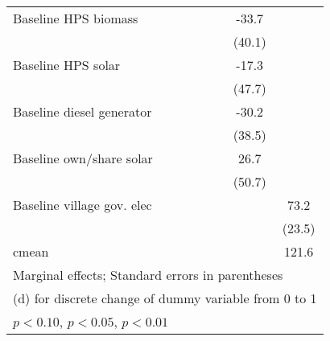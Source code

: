 \begin{table}[htbp]
\begin{tabular*}{1\hsize}{@{\hskip\tabcolsep\extracolsep\fill}l*{6}{c}}
Baseline HPS biomass&                  &                  &                  &                  &    -33.7         &                  \\
                &                  &                  &                  &                  &   (40.1)         &                  \\
Baseline HPS solar&                  &                  &                  &                  &    -17.3         &                  \\
                &                  &                  &                  &                  &   (47.7)         &                  \\
Baseline diesel generator&                  &                  &                  &                  &    -30.2         &                  \\
                &                  &                  &                  &                  &   (38.5)         &                  \\
Baseline own/share solar&                  &                  &                  &                  &     26.7         &                  \\
                &                  &                  &                  &                  &   (50.7)         &                  \\
Baseline village gov. elec&                  &                  &                  &                  &                  &     73.2\sym{***}\\
                &                  &                  &                  &                  &                  &   (23.5)         \\
\midrule
cmean           &                  &                  &                  &                  &                  &    121.6         \\
\bottomrule
\multicolumn{7}{l}{\footnotesize Marginal effects; Standard errors in parentheses}\\
\multicolumn{7}{l}{\footnotesize  (d) for discrete change of dummy variable from 0 to 1}\\
\multicolumn{7}{l}{\footnotesize \sym{*} \(p<0.10\), \sym{**} \(p<0.05\), \sym{***} \(p<0.01\)}\\
\end{tabular*}
\end{table}
